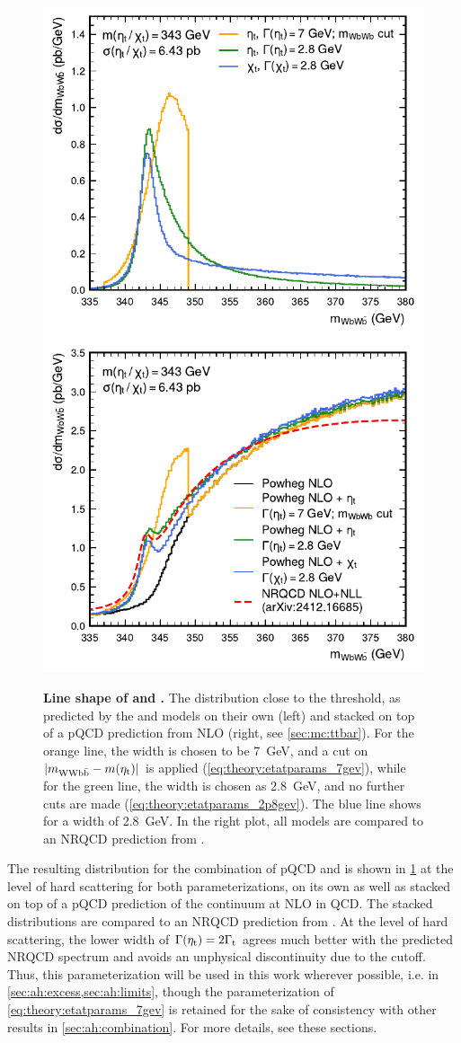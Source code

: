 \begin{figure}[t]
    \centering
    \includegraphics[width=0.49\linewidth]{figures/ah/etat_chit_small.pdf}
    \hfill
    \includegraphics[width=0.49\linewidth]{figures/ah/powheg_etat_nlo_small.pdf}
    \caption{\textbf{Line shape of \etat and \chit.} The \mWWbb distribution close to the \ttbar threshold, as predicted by the \etat and \chit models on their own (left) and stacked on top of a pQCD \ttbar prediction from \powheg NLO (right, see \cref{sec:mc:ttbar}). For the orange line, the \etat width is chosen to be \SI{7}{\GeV}, and a cut on $|m_{\mathrm{WWb\bar{b}}} - m(\mathrm{\eta_t})|$ is applied (\cref{eq:theory:etatparams_7gev}), while for the green line, the \etat width is chosen as \SI{2.8}{\GeV}, and no further cuts are made (\cref{eq:theory:etatparams_2p8gev}). The blue line shows \chit for a width of \SI{2.8}{\GeV}. In the right plot, all models are compared to an NRQCD prediction from .}
    \label{fig:theory:etat}
\end{figure}

The resulting \mWWbb distribution for the combination of pQCD \ttbar and \etat is shown in \cref{fig:theory:etat} at the level of hard scattering for both parameterizations, on its own as well as stacked on top of a pQCD prediction of the \ttbar continuum at NLO in QCD. The stacked distributions are compared to an NRQCD prediction from .
At the level of hard scattering, the lower width of $\Gamma(\mathrm{\eta_t}) = 2 \Gamma_{\mathrm{t}}$ agrees much better with the predicted NRQCD spectrum and avoids an unphysical discontinuity due to the \mWWbb cutoff. Thus, this parameterization will be used in this work wherever possible, i.e. in \cref{sec:ah:excess,sec:ah:limits}, though the parameterization of \cref{eq:theory:etatparams_7gev} is retained for the sake of consistency with other results in \cref{sec:ah:combination}. For more details, see these sections.

